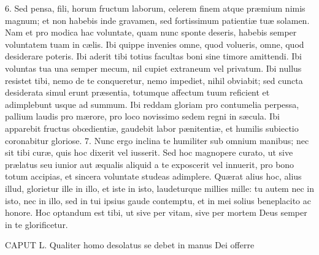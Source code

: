 6. Sed pensa, fili, horum fructum laborum, celerem finem atque præmium nimis magnum; et non habebis inde gravamen, sed fortissimum patientiæ tuæ solamen. Nam et pro modica hac voluntate, quam nunc sponte deseris, habebis semper voluntatem tuam in cælis. Ibi quippe invenies omne, quod volueris, omne, quod desiderare poteris. Ibi aderit tibi totius facultas boni sine timore amittendi. Ibi voluntas tua una semper mecum, nil cupiet extraneum vel privatum. Ibi nullus resistet tibi, nemo de te conqueretur, nemo impediet, nihil obviabit; sed cuncta desiderata simul erunt præsentia, totumque affectum tuum reficient et adimplebunt usque ad summum. Ibi reddam gloriam pro contumelia perpessa, pallium laudis pro mærore, pro loco novissimo sedem regni in sæcula. Ibi apparebit fructus obœdientiæ, gaudebit labor pænitentiæ, et humilis subiectio coronabitur gloriose.
7. Nunc ergo inclina te humiliter sub omnium manibus; nec sit tibi curæ, quis hoc dixerit vel iusserit. Sed hoc magnopere curato, ut sive prælatus seu iunior aut æqualis aliquid a te exposcerit vel innuerit, pro bono totum accipias, et sincera voluntate studeas adimplere. Quærat alius hoc, alius illud, glorietur ille in illo, et iste in isto, laudeturque millies mille: tu autem nec in isto, nec in illo, sed in tui ipsius gaude contemptu, et in mei solius beneplacito ac honore. Hoc optandum est tibi, ut sive per vitam, sive per mortem Deus semper in te glorificetur.


CAPUT L.
Qualiter homo desolatus se debet in manus Dei offerre

